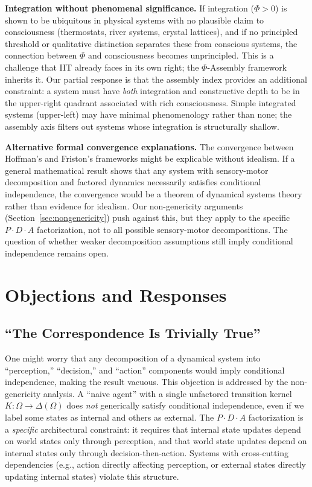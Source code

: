 \documentclass[11pt,a4paper]{article}
\theoremstyle{definition}
\theoremstyle{plain}
\theoremstyle{remark}
\begin{document}
\textbf{Integration without phenomenal significance.} If integration ($\Phi > 0$) is shown to be ubiquitous in physical systems with no plausible claim to consciousness (thermostats, river systems, crystal lattices), and if no principled threshold or qualitative distinction separates these from conscious systems, the connection between $\Phi$ and consciousness becomes unprincipled. This is a challenge that IIT already faces in its own right; the $\Phi$-Assembly framework inherits it. Our partial response is that the assembly index provides an additional constraint: a system must have \textit{both} integration and constructive depth to be in the upper-right quadrant associated with rich consciousness. Simple integrated systems (upper-left) may have minimal phenomenology rather than none; the assembly axis filters out systems whose integration is structurally shallow.

\textbf{Alternative formal convergence explanations.} The convergence between Hoffman's and Friston's frameworks might be explicable without idealism. If a general mathematical result shows that any system with sensory-motor decomposition and factored dynamics necessarily satisfies conditional independence, the convergence would be a theorem of dynamical systems theory rather than evidence for idealism. Our non-genericity arguments (Section~\ref{sec:nongenericity}) push against this, but they apply to the specific $P \cdot D \cdot A$ factorization, not to all possible sensory-motor decompositions. The question of whether weaker decomposition assumptions still imply conditional independence remains open.

\section{Objections and Responses}\label{sec:objections}

\subsection{``The Correspondence Is Trivially True''}

One might worry that any decomposition of a dynamical system into ``perception,'' ``decision,'' and ``action'' components would imply conditional independence, making the result vacuous. This objection is addressed by the non-genericity analysis. A ``naive agent'' with a single unfactored transition kernel $K: \Omega \to \Delta(\Omega)$ does \textit{not} generically satisfy conditional independence, even if we label some states as internal and others as external. The $P \cdot D \cdot A$ factorization is a \textit{specific} architectural constraint: it requires that internal state updates depend on world states only through perception, and that world state updates depend on internal states only through decision-then-action. Systems with cross-cutting dependencies (e.g., action directly affecting perception, or external states directly updating internal states) violate this structure.
\end{document}
